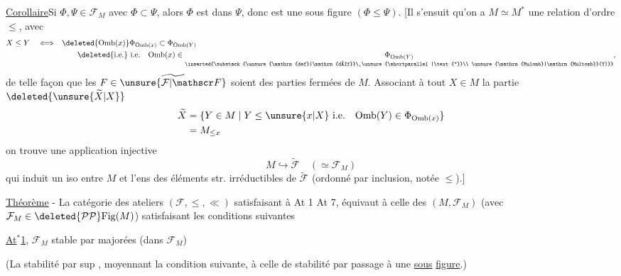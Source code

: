 \uline{Corollaire}\quad Si $\Phi,\Psi\in\mathcal F_M$ avec $\Phi\subset\Psi$, alors $\Phi$ est  dans $\Psi$, donc est une sous figure $(\Phi\leq\Psi)$.
[Il s'ensuit qu'on a  $M\simeq M^{*}$ une relation d'ordre $\leq$, avec
\[
\begin{aligned}
 X\leq Y\quad\Longleftrightarrow\quad&
 \deleted{\mathrm{Omb}(x)}\Phi_{\mathrm{Omb}(x)}
 \subset\Phi_{\mathrm{Omb}(Y)}\\
 &\qquad\deleted{\text{i.e.}}\ \text{i.e.}\quad
 \mathrm{Omb}(x)\in
 \underset{\inserted{\substack{\unsure{\mathrm{def}|\mathrm{déf}}\ \unsure{\shortparallel|\text{''}}\\
 \unsure{\mathrm{Mulomb}|\mathrm{Multomb}}(Y)}}}{\Phi_{\mathrm{Omb}(Y)}},
\end{aligned}
\]
de telle façon que les  $F\in\widetilde{\unsure{\mathcal F|\mathscr F}}$ soient des parties fermées de $M$.
Associant à tout $X\in M$ la partie $\deleted{\unsure{\widetilde X|X}}$
\[
\begin{aligned}
 \widetilde X&=\{Y\in M\mid Y\leq\unsure{x|X}\ \text{i.e.}\quad
 \mathrm{Omb}(Y)\in\Phi_{\mathrm{Omb}(x)}\}\\
 &=M_{\leq x}
\end{aligned}
\]
on trouve une application injective
\[
 M\hookrightarrow\widetilde{\mathcal F}\quad(\simeq\mathcal F_M)
\]
qui induit un iso entre $M$ et l'ens des éléments str. irréductibles de $\widetilde{\mathcal F}$ (ordonné par inclusion, notée $\leq$).]


\uline{Théorème} - \quad La catégorie  des  ateliers $(\mathcal F,\leq,\ll)$ satisfaisant à At 1  At 7, équivaut à celle des $(M,\mathcal F_M)$ (avec $\mathcal F_M\in\deleted{\mathcal P\mathcal P}\mathrm{Fig}(M)$) satisfaisant les conditions suivantes

\uline{At$^{*}$1}, $\mathcal F_M$   stable par   majorées (dans $\mathcal F_M$)

 (La stabilité par sup , moyennant la condition suivante, à celle de  stabilité par passage à une \uline{sous}  \uline{figure}.)
